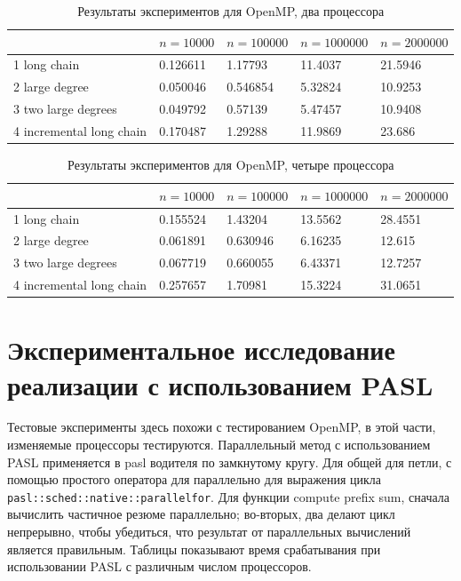 \documentclass[specification,annotation,times]{itmo-student-thesis}
\newcommand{\revise}[1]{{\color{red!70!black} #1 }}
\begin{document}
\begin{table}[!ht]
\centering
\begin{tabular}{|l|l|l|l|l|}\hline
 & $n=10000$ & $n=100000$ & $n=1000000$ & $n=2000000$ \\\hline
1 long chain & 0.126611 & 1.17793 & 11.4037 & 21.5946 \\\hline
2 large degree & 0.050046 & 0.546854 & 5.32824 & 10.9253 \\\hline
3 two large degrees & 0.049792 & 0.57139 & 5.47457 & 10.9408 \\\hline
4 incremental long chain & 0.170487 & 1.29288 & 11.9869 & 23.686 \\\hline
\end{tabular}
\caption{Результаты экспериментов для OpenMP, два процессора}\label{tbl:results-openmp-2}
\end{table}

\begin{table}[!ht]
\centering
\begin{tabular}{|l|l|l|l|l|}\hline
 & $n=10000$ & $n=100000$ & $n=1000000$ & $n=2000000$ \\\hline
1 long chain & 0.155524 & 1.43204 & 13.5562 & 28.4551 \\\hline
2 large degree & 0.061891 & 0.630946 & 6.16235 & 12.615 \\\hline
3 two large degrees & 0.067719 & 0.660055 & 6.43371 & 12.7257 \\\hline
4 incremental long chain & 0.257657 & 1.70981 & 15.3224 & 31.0651 \\\hline
\end{tabular}
\caption{Результаты экспериментов для OpenMP, четыре процессора}\label{tbl:results-openmp-4}
\end{table}

\section{Экспериментальное исследование реализации с использованием PASL}

\revise{
Тестовые эксперименты здесь похожи с тестированием OpenMP, в этой части, изменяемые процессоры тестируются. Параллельный метод с использованием PASL применяется в pasl водителя по замкнутому кругу. Для 
общей для петли, с помощью простого оператора для параллельно для выражения цикла \texttt{pasl::sched::native::parallel{\textunderscore}for}. Для функции compute prefix sum, сначала вычислить частичное 
резюме параллельно; 
во-вторых, два делают цикл непрерывно, чтобы убедиться, что результат от параллельных вычислений является правильным. Таблицы показывают время срабатывания при использовании PASL с различным числом 
процессоров.
}
\end{document}
